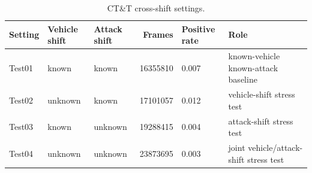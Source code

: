 \begin{table}[H]
\caption{CT\&T cross-shift settings.}\label{tab:settings}
\centering\small
\begin{tabular}{lllrll}
\hline
Setting & Vehicle shift & Attack shift & Frames & Positive rate & Role \\
\hline
Test01 & known & known & 16355810 & 0.007 & known-vehicle known-attack baseline \\
Test02 & unknown & known & 17101057 & 0.012 & vehicle-shift stress test \\
Test03 & known & unknown & 19288415 & 0.004 & attack-shift stress test \\
Test04 & unknown & unknown & 23873695 & 0.003 & joint vehicle/attack-shift stress test \\
\hline
\end{tabular}
\end{table}
